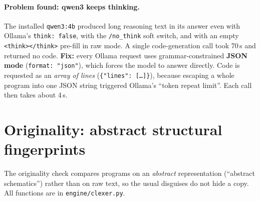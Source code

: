\documentclass[11pt,a4paper]{article}
\newcommand{\file}[1]{\nolinkurl{#1}}
\begin{document}
\paragraph{Problem found: qwen3 keeps thinking.} The installed \texttt{qwen3:4b} produced long reasoning text in its
answer even with Ollama's \texttt{think: false}, with the \texttt{/no\_think} soft switch, and with an empty
\texttt{<think></think>} pre-fill in raw mode. A single code-generation call took 70\,s and returned no code.
\textbf{Fix:} every Ollama request uses grammar-constrained \textbf{JSON mode} (\texttt{format: "json"}), which forces the
model to answer directly. Code is requested as an \emph{array of lines}
(\texttt{\{"lines": [\ldots]\}}), because escaping a whole program into one JSON string triggered Ollama's
``token repeat limit''. Each call then takes about 4\,s.

\section{Originality: abstract structural fingerprints}\label{sec:sim}
The originality check compares programs on an \emph{abstract} representation (``abstract schematics'')
rather than on raw text, so the usual disguises do not hide a copy. All functions are in \file{engine/clexer.py}.
\end{document}
